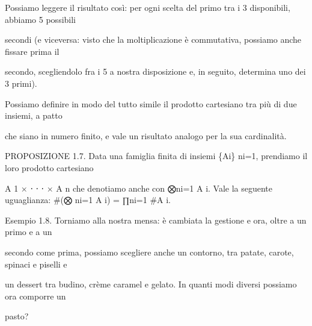 \documentclass[a4paper,portrait,12pt]{article}
\begin{document}
\begin{flushleft}
Possiamo leggere il risultato così: per ogni scelta del primo tra i 3 disponibili, abbiamo 5 possibili
\end{flushleft}


\begin{flushleft}
secondi (e viceversa: visto che la moltiplicazione \`{e} commutativa, possiamo anche fissare prima il
\end{flushleft}


\begin{flushleft}
secondo, scegliendolo fra i 5 a nostra disposizione e, in seguito, determina uno dei 3 primi).
\end{flushleft}


\begin{flushleft}
Possiamo definire in modo del tutto simile il prodotto cartesiano tra più di due insiemi, a patto
\end{flushleft}


\begin{flushleft}
che siano in numero finito, e vale un risultato analogo per la sua cardinalit\`{a}.
\end{flushleft}


\begin{flushleft}
PROPOSIZIONE 1.7. Data una famiglia finita di insiemi \{Ai\} ni=1, prendiamo il loro prodotto cartesiano
\end{flushleft}


\begin{flushleft}
A 1 × ⋅ ⋅ ⋅ × A n che denotiamo anche con ⨂ni=1 A i. Vale la seguente uguaglianza: \#(⨂ ni=1 A i) = ∏ni=1 \#A i.
\end{flushleft}


\begin{flushleft}
Esempio 1.8. Torniamo alla nostra mensa: \`{e} cambiata la gestione e ora, oltre a un primo e a un
\end{flushleft}


\begin{flushleft}
secondo come prima, possiamo scegliere anche un contorno, tra patate, carote, spinaci e piselli e
\end{flushleft}


\begin{flushleft}
un dessert tra budino, cr\`{e}me caramel e gelato. In quanti modi diversi possiamo ora comporre un
\end{flushleft}


\begin{flushleft}
pasto?
\end{flushleft}
\end{document}
